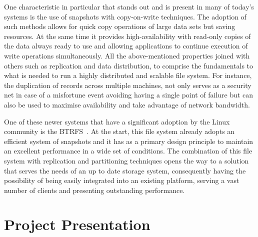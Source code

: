 One characteristic in particular that stands out and is present in many of today's systems is the use of snapshots with copy-on-write techniques. The adoption of such methods allows for quick copy operations of large data sets but saving resources. At the same time it provides high-availability with read-only copies of the data always ready to use and allowing applications to continue execution of write operations simultaneously.
All the above-mentioned properties joined with others such as replication and data distribution, to comprise the fundamentals to what is needed to run a highly distributed and scalable file system. For instance, the duplication of records across multiple machines, not only serves as a security net in case of a misfortune event avoiding having a single point of failure but can also be used to maximise availability and take advantage of network bandwidth. 
%



One of these newer systems that have a significant adoption by the Linux community is the BTRFS~\cite{Rodeh2013}. At the start, this file system already adopts an efficient system of snapshots and it has as a primary design principle to maintain an excellent performance in a wide set of conditions.
The combination of this file system with replication and partitioning techniques opens the way to a solution that serves the needs of an up to date storage system, consequently having the possibility of being easily integrated into an existing platform, serving a vast number of clients and presenting outstanding performance. 





\section{Project Presentation} %
\label{sec:project_presentation}

